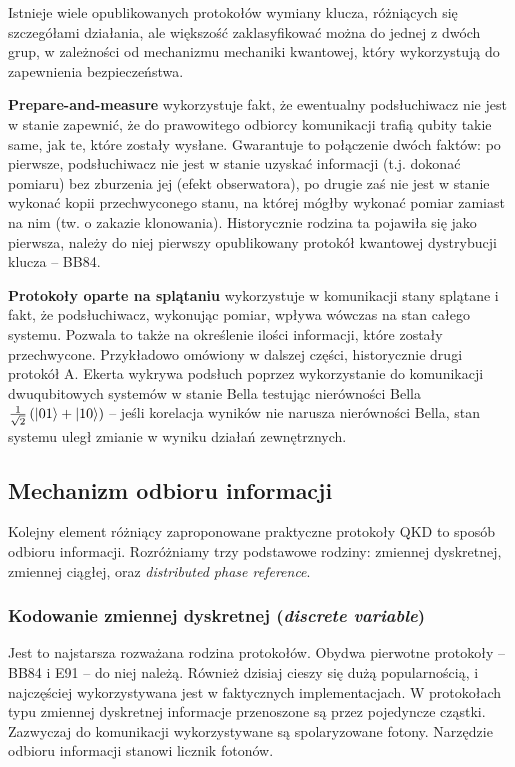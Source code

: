 \documentclass[10pt]{article}
\begin{document}
Istnieje wiele opublikowanych protokołów wymiany klucza, różniących się szczegółami działania, ale
większość zaklasyfikować można do jednej z dwóch grup, w zależności od mechanizmu mechaniki
kwantowej, który wykorzystują do zapewnienia bezpieczeństwa.

\textbf{Prepare-and-measure} wykorzystuje fakt, że ewentualny podsłuchiwacz nie jest w stanie zapewnić,
że do prawowitego odbiorcy komunikacji trafią qubity takie same, jak te, które zostały wysłane.
Gwarantuje to połączenie dwóch faktów: po pierwsze, podsłuchiwacz nie jest w stanie uzyskać informacji
(t.j. dokonać pomiaru) bez zburzenia jej (efekt obserwatora), po drugie zaś nie jest w stanie wykonać
kopii przechwyconego stanu, na której mógłby wykonać pomiar zamiast na nim (tw. o zakazie klonowania).
Historycznie rodzina ta pojawiła się jako pierwsza, należy do niej pierwszy opublikowany protokół
kwantowej dystrybucji klucza -- BB84\cite{bb84,Scarani09}.

\textbf{Protokoły oparte na splątaniu} wykorzystuje w komunikacji stany splątane i fakt, że 
podsłuchiwacz, wykonując pomiar, wpływa wówczas na stan całego systemu. Pozwala to także na określenie
ilości informacji, które zostały przechwycone. Przykładowo omówiony w dalszej części, historycznie
drugi protokół A. Ekerta wykrywa podsłuch poprzez wykorzystanie do komunikacji dwuqubitowych systemów
w stanie Bella testując nierówności Bella \(\frac{1}{\sqrt{2}}\left(\Ket{01}+\Ket{10}\right)\) 
-- jeśli korelacja wyników nie narusza nierówności Bella, stan systemu uległ zmianie w wyniku działań
zewnętrznych\cite{Ekert91,Ekert12}.

\subsection{Mechanizm odbioru informacji}

Kolejny element różniący zaproponowane praktyczne protokoły QKD to sposób odbioru informacji.
Rozróżniamy trzy podstawowe rodziny: zmiennej dyskretnej, zmiennej ciągłej, oraz \emph{distributed
phase reference}\cite{Scarani09}.

\subsubsection*{Kodowanie zmiennej dyskretnej (\emph{discrete variable})}

Jest to najstarsza rozważana rodzina protokołów. Obydwa pierwotne protokoły -- BB84 i E91 -- do niej 
należą. Również dzisiaj cieszy się dużą popularnością, i najczęściej wykorzystywana jest w faktycznych
implementacjach. W protokołach typu zmiennej dyskretnej informacje przenoszone są przez pojedyncze 
cząstki. Zazwyczaj do komunikacji wykorzystywane są spolaryzowane fotony. Narzędzie odbioru informacji
stanowi licznik fotonów.
\end{document}
